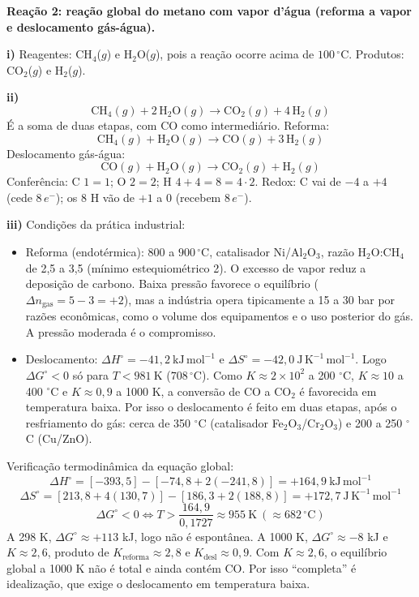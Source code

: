 \documentclass{article}%
\begin{document}
\textbf{Reação 2: reação global do metano com vapor d'água (reforma a vapor e deslocamento gás-água).}

\textbf{i)} Reagentes: CH$_4$($g$) e H$_2$O($g$), pois a reação ocorre acima de $100\,^\circ$C. Produtos: CO$_2$($g$) e H$_2$($g$).

\textbf{ii)}
\[ \mathrm{CH_4}(g) + 2\,\mathrm{H_2O}(g) \rightarrow \mathrm{CO_2}(g) + 4\,\mathrm{H_2}(g) \]
É a soma de duas etapas, com CO como intermediário. Reforma:
\[ \mathrm{CH_4}(g) + \mathrm{H_2O}(g) \rightarrow \mathrm{CO}(g) + 3\,\mathrm{H_2}(g) \]
Deslocamento gás-água:
\[ \mathrm{CO}(g) + \mathrm{H_2O}(g) \rightarrow \mathrm{CO_2}(g) + \mathrm{H_2}(g) \]
Conferência: C $1=1$; O $2=2$; H $4+4=8=4\cdot 2$. Redox: C vai de $-4$ a $+4$ (cede $8\,e^-$); os 8 H vão de $+1$ a $0$ (recebem $8\,e^-$).

\textbf{iii)} Condições da prática industrial:
\begin{itemize}
\item Reforma (endotérmica): $800$ a $900\,^\circ$C, catalisador Ni/Al$_2$O$_3$, razão H$_2$O:CH$_4$ de 2,5 a 3,5 (mínimo estequiométrico 2). O excesso de vapor reduz a deposição de carbono. Baixa pressão favorece o equilíbrio ($\Delta n_{\mathrm{gas}} = 5 - 3 = +2$), mas a indústria opera tipicamente a 15 a 30 bar por razões econômicas, como o volume dos equipamentos e o uso posterior do gás. A pressão moderada é o compromisso.
\item Deslocamento: $\Delta H^\circ = -41{,}2\ \mathrm{kJ\,mol^{-1}}$ e $\Delta S^\circ = -42{,}0\ \mathrm{J\,K^{-1}\,mol^{-1}}$. Logo $\Delta G^\circ < 0$ só para $T < 981\ \mathrm{K}$ ($708\,^\circ$C). Como $K \approx 2\times 10^2$ a 200 $^\circ$C, $K \approx 10$ a 400 $^\circ$C e $K \approx 0{,}9$ a 1000 K, a conversão de CO a CO$_2$ é favorecida em temperatura baixa. Por isso o deslocamento é feito em duas etapas, após o resfriamento do gás: cerca de 350 $^\circ$C (catalisador Fe$_2$O$_3$/Cr$_2$O$_3$) e 200 a 250 $^\circ$C (Cu/ZnO).
\end{itemize}

Verificação termodinâmica da equação global:
\[ \Delta H^\circ = \left[-393{,}5\right] - \left[-74{,}8 + 2(-241{,}8)\right] = +164{,}9\ \mathrm{kJ\,mol^{-1}} \]
\[ \Delta S^\circ = \left[213{,}8 + 4(130{,}7)\right] - \left[186{,}3 + 2(188{,}8)\right] = +172{,}7\ \mathrm{J\,K^{-1}\,mol^{-1}} \]
\[ \Delta G^\circ < 0 \Leftrightarrow T > \frac{164{,}9}{0{,}1727} \approx 955\ \mathrm{K}\ (\approx 682\,^\circ\mathrm{C}) \]
A 298 K, $\Delta G^\circ \approx +113$ kJ, logo não é espontânea. A 1000 K, $\Delta G^\circ \approx -8$ kJ e $K \approx 2{,}6$, produto de $K_{\text{reforma}} \approx 2{,}8$ e $K_{\text{desl}} \approx 0{,}9$. Com $K \approx 2{,}6$, o equilíbrio global a 1000 K não é total e ainda contém CO. Por isso ``completa'' é idealização, que exige o deslocamento em temperatura baixa.
\end{document}
